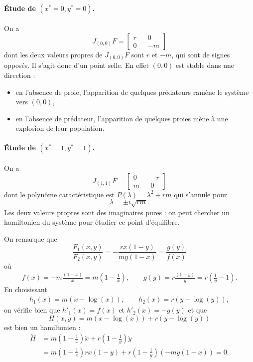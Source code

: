 \paragraph*{\'Etude de $(x^* = 0, y^* = 0)$.}
On a 
$$
J_{(0, 0)}F = 
  \left[\begin{array}{rcr} 
    r  & & 0 \\
    0 & & -m 
  \end{array}\right]
$$
dont les deux valeurs propres de $J_{(0, 0)}F$ sont $r$ et $-m$, qui sont de signes opposés. Il s'agit donc d'un point selle. En effet $(0, 0)$ est stable dans une direction : 
\begin{itemize}
  \item en l'absence de proie, l'apparition de quelques prédateurs ramène le système vers $(0, 0)$, 
  \item en l'absence de prédateur, l'apparition de quelques proies mène à une explosion de leur population.
\end{itemize}
  
\paragraph*{\'Etude de $(x^* = 1, y^* = 1)$.}
On a 
$$
J_{(1, 1)}F = 
  \left[\begin{array}{rcr} 
    0 & & -r  \\
    m  & & 0
  \end{array}\right]
$$
dont le polynôme caractéristique est $P(\lambda) = \lambda^2 + rm$ qui s'annule pour
$$
\lambda = \pm i \sqrt{rm}.
$$
Les deux valeurs propres sont des imaginaires pures : on peut chercher un hamiltonien du système pour étudier ce point d'équilibre.

\bigskip
On remarque que 
$$
\frac{F_1(x, y)}{F_2(x, y)} = -\frac{rx(1-y)}{my(1-x)} = \frac{g(y)}{f(x)}
$$
où
\begin{align*}
f(x) = -m \frac{(1-x)}{x} = m \left(1 - \frac1x\right), \qquad
g(y) = r \frac{(1-y)}{y} = r \left(\frac1y - 1\right).
\end{align*}
En choisissant 
\begin{align*}
  h_1(x) = m(x-\log(x)), \qquad h_2(x) = r(y-\log(y)),
\end{align*}
on vérifie bien que $h'_1(x) = f(x)$ et $h'_2(x) = -g(y)$ et que 
$$
H(x, y) = m(x-\log(x)) + r(y-\log(y))
$$
est bien un hamiltonien : 
\begin{align*}
\dot H 
& = m\left(1 - \frac1x\right) \dot x + r \left(1 - \frac1y\right) \dot y \\
& = m\left(1 - \frac1x\right) r x (1 - y) + r \left(1 - \frac1y\right) (- m y (1 - x)) 
= 0.
\end{align*}

